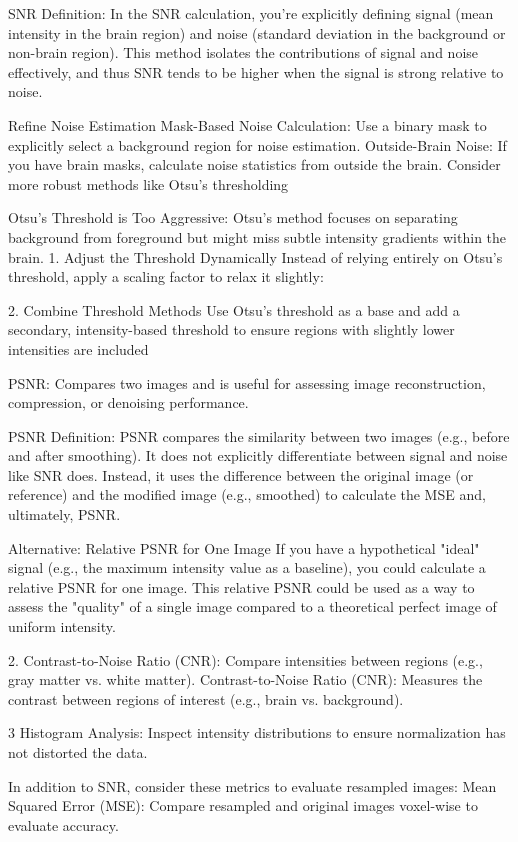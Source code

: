 SNR Definition:
In the SNR calculation, you're explicitly defining signal (mean intensity in the brain region) and noise (standard deviation in the background or non-brain region).
This method isolates the contributions of signal and noise effectively, and thus SNR tends to be higher when the signal is strong relative to noise.

Refine Noise Estimation
Mask-Based Noise Calculation: Use a binary mask to explicitly select a background region for noise estimation.
Outside-Brain Noise: If you have brain masks, calculate noise statistics from outside the brain.
Consider more robust methods like Otsu's thresholding 

Otsu's Threshold is Too Aggressive:
Otsu's method focuses on separating background from foreground but might miss subtle intensity gradients within the brain.
1. Adjust the Threshold Dynamically
Instead of relying entirely on Otsu's threshold, apply a scaling factor to relax it slightly:

2. Combine Threshold Methods
Use Otsu’s threshold as a base and add a secondary, intensity-based threshold to ensure regions with slightly lower intensities are included

PSNR: Compares two images and is useful for assessing image reconstruction, compression, or denoising performance.

PSNR Definition:
PSNR compares the similarity between two images (e.g., before and after smoothing).
It does not explicitly differentiate between signal and noise like SNR does.
Instead, it uses the difference between the original image (or reference) and the modified image (e.g., smoothed) to calculate the MSE and, ultimately, PSNR.

Alternative: Relative PSNR for One Image
If you have a hypothetical "ideal" signal (e.g., the maximum intensity value as a baseline), you could calculate a relative PSNR for one image. This relative PSNR could be used as a way to assess the "quality" of a single image compared to a theoretical perfect image of uniform intensity.

2. Contrast-to-Noise Ratio (CNR):
Compare intensities between regions (e.g., gray matter vs. white matter). Contrast-to-Noise Ratio (CNR): Measures the contrast between regions of interest (e.g., brain vs. background).

3 Histogram Analysis:
Inspect intensity distributions to ensure normalization has not distorted the data.

In addition to SNR, consider these metrics to evaluate resampled images:
Mean Squared Error (MSE): Compare resampled and original images voxel-wise to evaluate accuracy.

